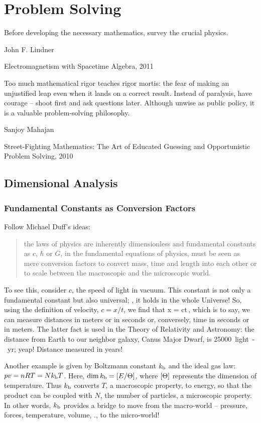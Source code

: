 \section{Problem Solving}

\epigraph{Before developing the necessary mathematics, survey the crucial physics.}
{John F. Lindner}
{Electromagnetism with Spacetime Algebra, 2011}


\epigraph{Too much mathematical rigor teaches rigor mortis: the fear of making an unjustified leap even when it lands on a correct result. Instead of paralysis, have courage -- shoot first and ask questions later. Although unwise as public policy, it is a valuable problem-solving philosophy.}
{Sanjoy Mahajan}
{Street-Fighting Mathematics: The Art of Educated Guessing and Opportunistic Problem Solving, 2010}


\subsection{Dimensional Analysis}

\subsubsection{Fundamental Constants as Conversion Factors}
Follow Michael Duff's ideas:
\begin{quote}
the laws of physics are inherently dimensionless and fundamental constants as $c$, $\hbar$ or $G$, in the fundamental equations of physics, must be seen as mere conversion factors to convert mass, time and length into each other or to scale between the macroscopic and the microscopic world.
\end{quote}

To see this, consider $c$, the speed of light in vacuum. This constant is not only a fundamental constant but also universal; \ie, it holds in the whole Universe! So, using the definition of velocity, $c = x/t$, we find that
\beq
x = ct\,,
\eeq
which is to say, we can measure distances in meters or in seconds or, conversely, time in seconds or in meters. The latter fact is used in the Theory of Relativity and Astronomy: the distance from Earth to our neighbor galaxy, Canus Major Dwarf, is \SI{25000}{light-yr}; yeap! Distance measured in years!

Another example is given by Boltzmann constant $k_\text{b}$ and the ideal gas law: $pv = nRT = Nk_\text{b} T$. Here, $\dim k_\text{b} = \left[{E/\Theta}\right]$, where $\left[{\Theta}\right]$ represents the dimension of temperature. Thus $k_\text{b}$ converts $T$, a macroscopic property, to energy, so that the product can be coupled with $N$, the number of particles, a microscopic property. In other words, $k_\text{b}$ provides a bridge to move from the macro-world -- pressure, forces, temperature, volume, \etc., to the micro-world!


